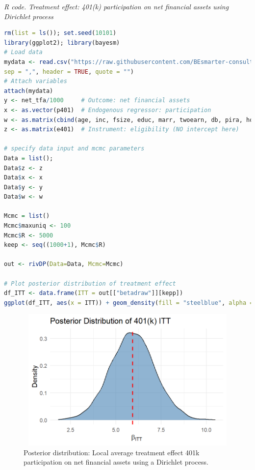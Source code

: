 \begin{enumerate}[leftmargin=*]
\begin{tcolorbox}[enhanced,width=4.67in,center upper,
	fontupper=\large\bfseries,drop shadow southwest,sharp corners]
	\textit{R code. Treatment effect: 401(k) participation on net financial assets using Dirichlet process}
	\begin{VF}
		\begin{lstlisting}[language=R]		
rm(list = ls()); set.seed(10101)
library(ggplot2); library(bayesm)
# Load data
mydata <- read.csv("https://raw.githubusercontent.com/BEsmarter-consultancy/BSTApp/refs/heads/master/DataApp/401k.csv",
sep = ",", header = TRUE, quote = "")
# Attach variables
attach(mydata)
y <- net_tfa/1000     # Outcome: net financial assets
x <- as.vector(p401)  # Endogenous regressor: participation
w <- as.matrix(cbind(age, inc, fsize, educ, marr, twoearn, db, pira, hown))  # Exogenous regressors with intercept
z <- as.matrix(e401)  # Instrument: eligibility (NO intercept here)

# specify data input and mcmc parameters
Data = list(); 
Data$z <- z
Data$x <- x
Data$y <- y
Data$w <- w

Mcmc = list()
Mcmc$maxuniq <- 100
Mcmc$R <- 5000
keep <- seq((1000+1), Mcmc$R)

out <- rivDP(Data=Data, Mcmc=Mcmc)

# Plot posterior distribution of treatment effect
df_ITT <- data.frame(ITT = out[["betadraw"]][kepp])
ggplot(df_ITT, aes(x = ITT)) + geom_density(fill = "steelblue", alpha = 0.6) + geom_vline(xintercept = mean(ITT), color = "red", linetype = "dashed", linewidth = 1) + labs(title = "Posterior Distribution of 401(k) ITT: Dirichlet process", x = expression(beta["ITT"]), y = "Density") + theme_minimal(base_size = 14)
\end{lstlisting}
	\end{VF}
\end{tcolorbox} 

\begin{figure}[h!]
	\includegraphics[width=340pt, height=200pt]{Chapters/chapter12/figures/FigP401k.png}
	\caption[List of figure caption goes here]{Posterior distribution: Local average treatment effect 401k participation on net financial assets using a Dirichlet process.}\label{fig12_2}
\end{figure}


\end{enumerate}